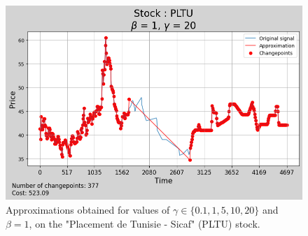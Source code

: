 \documentclass[11pt]{article}
\begin{document}
\begin{figure}[H]
    \begin{minipage}[t]{0.42\textwidth}
        \includegraphics[width=\textwidth]{figures/results/scale_analysis_beta_1_stock_PLTU/scale_20.png}
    \end{minipage}
    \begin{minipage}[t]{0.42\textwidth}
        \hspace{0.42\textwidth}
    \end{minipage}

    \caption{Approximations obtained for values of $\gamma \in \{0.1, 1, 5, 10, 20\}$ and $\beta = 1$, on the "Placement de Tunisie - Sicaf" (PLTU) stock.}
    \label{fig:approximations_gamma}
\end{figure}
\end{document}
